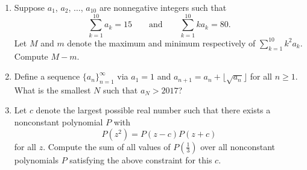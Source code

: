 \documentclass[10pt]{article}
\begin{document}
\begin{enumerate}
\item Suppose $a_1$, $a_2$, $\ldots$, $a_{10}$ are nonnegative integers such that \[\sum_{k=1}^{10}a_k=15\qquad\text{and}\qquad \sum_{k=1}^{10}ka_k = 80.\] Let $M$ and $m$ denote the maximum and minimum respectively of $\sum_{k=1}^{10}k^2a_k$.  Compute $M-m$.

\item Define a sequence $\{a_{n}\}_{n=1}^{\infty}$ via $a_{1} = 1$ and $a_{n+1} = a_{n} + \lfloor \sqrt{a_{n}} \rfloor$ for all $n \geq 1$. What is the smallest $N$ such that $a_{N} > 2017$?

\item Let $c$ denote the largest possible real number such that there exists a nonconstant polynomial $P$ with \[P(z^2)=P(z-c)P(z+c)\] for all $z$.  Compute the sum of all values of $P(\tfrac13)$ over all nonconstant polynomials $P$ satisfying the above constraint for this $c$.

\end{enumerate}
\end{document}
